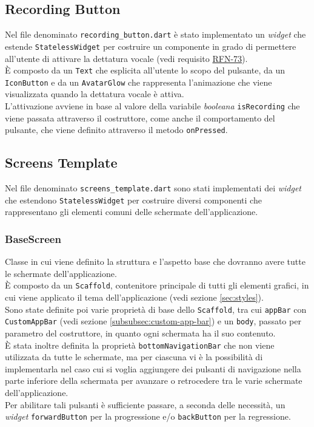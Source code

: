 \subsection{Recording Button}
\label{subsec:recording-button}

Nel file denominato \lstinline{recording_button.dart} è stato implementato un \emph{widget} che estende \lstinline{StatelessWidget} per costruire un componente in grado di permettere all'utente di attivare la dettatura vocale (vedi requisito \hyperref[RFN-73]{RFN-73}).\\
È composto da un \lstinline{Text}\cite{site:text} che esplicita all'utente lo scopo del pulsante, da un \lstinline{IconButton}\cite{site:icon-button} e da un \lstinline{AvatarGlow}\cite{site:avatar-glow} che rappresenta l'animazione che viene visualizzata quando la dettatura vocale è attiva.\\
L'attivazione avviene in base al valore della variabile \emph{booleana} \lstinline{isRecording} che viene passata attraverso il costruttore, come anche il comportamento del pulsante, che viene definito attraverso il metodo \lstinline{onPressed}.

\subsection{Screens Template}
\label{subsec:screens-template}

Nel file denominato \lstinline{screens_template.dart} sono stati implementati dei \emph{widget} che estendono \lstinline{StatelessWidget} per costruire diversi componenti che rappresentano gli elementi comuni delle schermate dell'applicazione.

\subsubsection*{BaseScreen}
\label{subsubsec:base-screen}

Classe in cui viene definito la struttura e l'aspetto base che dovranno avere tutte le schermate dell'applicazione.\\
È composto da un \lstinline{Scaffold}\cite{site:scaffold}, contenitore principale di tutti gli elementi grafici, in cui viene applicato il tema dell'applicazione (vedi sezione \ref{sec:styles}). \\
Sono state definite poi varie proprietà di base dello \lstinline{Scaffold}, tra cui \lstinline{appBar} con \lstinline{CustomAppBar} (vedi sezione \ref{subsubsec:custom-app-bar}) e un \lstinline{body}, passato per parametro del costruttore, in quanto ogni schermata ha il suo contenuto.\\
È stata inoltre definita la proprietà \lstinline{bottomNavigationBar} che non viene utilizzata da tutte le schermate, ma per ciascuna vi è la possibilità di implementarla nel caso cui si voglia aggiungere dei pulsanti di navigazione nella parte inferiore della schermata per avanzare o retrocedere tra le varie schermate dell'applicazione.\\
Per abilitare tali pulsanti è sufficiente passare, a seconda delle necessità, un \emph{widget} \lstinline{forwardButton} per la progressione e/o \lstinline{backButton} per la regressione.\\

